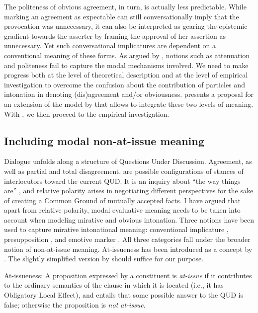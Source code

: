 The politeness of obvious agreement, in turn, is actually less predictable. While marking an agreement as expectable can still conversationally imply that the provocation was unnecessary, it can also be interpreted as gearing the epistemic gradient towards the asserter by framing the approval of her assertion as unnecessary. Yet such conversational implicatures are dependent on a conventional meaning of these forms. As argued by \citet[188--189]{Waltereit.2006}, notions such as attenuation and politeness fail to capture the modal mechanisms involved. We need to make progress both at the level of theoretical description and at the level of empirical investigation to overcome the confusion about the contribution of particles and intonation in denoting (dis)agreement and/or obviousness.  presents a proposal for an extension of the model by \citeauthor{FarkasBruce.2010} that allows to integrate these two levels of meaning. With , we then proceed to the empirical investigation.

\subsection{Including modal non-at-issue meaning}
\label{ch:3.3.3}

Dialogue unfolds along a structure of Questions Under Discussion. Agreement, as well as partial and total disagreement, are possible configurations of stances of interlocutors toward the current \ac{QUD}. It is an inquiry about ``the way things are'' \citep{Roberts.2012}, and relative polarity arises in negotiating different perspectives for the sake of creating a Common Ground of mutually accepted facts. I have argued that apart from relative polarity, modal evaluative meaning needs to be taken into account when modeling mirative and obvious intonation. Three notions have been used to capture mirative intonational meaning: conventional implicature \citep{BianchiBocciCruschina.2016}, presupposition \citep{Reich.2018}, and emotive marker \citep{Rett.2021emotivemarkers}. All three categories fall under the broader notion of non-at-issue meaning. At-issueness has been introduced as a concept by \citet{SimonsTonhauserBeaverRoberts.2010whatandwhy}. The slightly simplified version by \citet[280]{BeaverRobertsSimonsTonhauser.2017} should suffice for our purpose.

\begin{displayquote}
	At-issueness: A proposition expressed by a constituent is \textit{at-issue} if it contributes to the ordinary semantics of the clause in which it is located (i.e., it has Obligatory Local Effect), and entails that some possible answer to the QUD is false; otherwise the proposition is \textit{not at-issue}.
\end{displayquote}\largerpage

